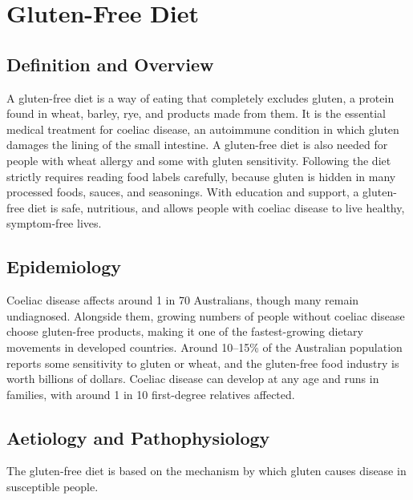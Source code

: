 \chapter{Gluten-Free Diet}

\section*{Definition and Overview}
A gluten-free diet is a way of eating that completely excludes gluten, a protein found in wheat, barley, rye, and products made from them. It is the essential medical treatment for coeliac disease, an autoimmune condition in which gluten damages the lining of the small intestine. A gluten-free diet is also needed for people with wheat allergy and some with gluten sensitivity. Following the diet strictly requires reading food labels carefully, because gluten is hidden in many processed foods, sauces, and seasonings. With education and support, a gluten-free diet is safe, nutritious, and allows people with coeliac disease to live healthy, symptom-free lives.

\section*{Epidemiology}
Coeliac disease affects around 1 in 70 Australians, though many remain undiagnosed. Alongside them, growing numbers of people without coeliac disease choose gluten-free products, making it one of the fastest-growing dietary movements in developed countries. Around 10--15\% of the Australian population reports some sensitivity to gluten or wheat, and the gluten-free food industry is worth billions of dollars. Coeliac disease can develop at any age and runs in families, with around 1 in 10 first-degree relatives affected.

\section*{Aetiology and Pathophysiology}
The gluten-free diet is based on the mechanism by which gluten causes disease in susceptible people.

